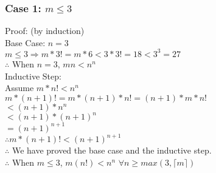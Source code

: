 \documentclass{article}
\begin{document}
        \subsubsection{Case 1: $m \leq 3$}
          Proof: (by induction) \\
          Base Case: $n = 3$ \\
          $m \leq 3 \Rightarrow m * 3! = m * 6 < 3 * 3! = 18 < 3^{3} = 27$ \\
          $\therefore$ When $n = 3$, $mn < n^{n}$ \\
          Inductive Step: \\
          Assume $m*n! < n^{n}$ \\
          $m * (n + 1)! = m * (n + 1) * n! = (n + 1) * m * n!$ \\
          $< (n + 1) * n^{n}$ \\
          $< (n + 1) * {(n + 1)}^{n}$ \\
          $= {(n + 1)}^{n + 1}$ \\
          $\therefore m * (n + 1)! < {(n + 1)}^{n + 1}$ \\
          $\therefore$ We have proved the base case and the inductive step. \\
          $\therefore$ When $m \leq 3$, $m(n!) < n^{n}$  $\forall n \geq max(3, \lceil m \rceil)$
\end{document}
